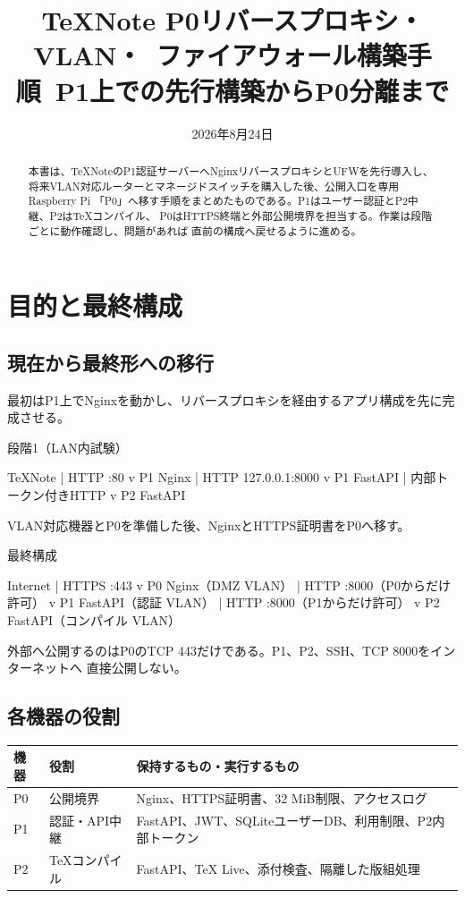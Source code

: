 \documentclass[uplatex,a4paper,11pt]{jsarticle}
\title{TeXNote P0リバースプロキシ・VLAN・\
ファイアウォール構築手順\
\large P1上での先行構築からP0分離まで}
\author{}
\date{2026年8月24日}
\begin{document}
\maketitle

\begin{abstract}
本書は、TeXNoteのP1認証サーバーへNginxリバースプロキシとUFWを先行導入し、
将来VLAN対応ルーターとマネージドスイッチを購入した後、公開入口を専用Raspberry Pi
「P0」へ移す手順をまとめたものである。P1はユーザー認証とP2中継、P2はTeXコンパイル、
P0はHTTPS終端と外部公開境界を担当する。作業は段階ごとに動作確認し、問題があれば
直前の構成へ戻せるように進める。
\end{abstract}

\tableofcontents
\newpage

\section{目的と最終構成}

\subsection{現在から最終形への移行}

最初はP1上でNginxを動かし、リバースプロキシを経由するアプリ構成を先に完成させる。

\begin{command}
段階1（LAN内試験）

TeXNote
   | HTTP :80
   v
P1 Nginx
   | HTTP 127.0.0.1:8000
   v
P1 FastAPI
   | 内部トークン付きHTTP
   v
P2 FastAPI
\end{command}

VLAN対応機器とP0を準備した後、NginxとHTTPS証明書をP0へ移す。

\begin{command}
最終構成

Internet
   | HTTPS :443
   v
P0 Nginx（DMZ VLAN）
   | HTTP :8000（P0からだけ許可）
   v
P1 FastAPI（認証 VLAN）
   | HTTP :8000（P1からだけ許可）
   v
P2 FastAPI（コンパイル VLAN）
\end{command}

外部へ公開するのはP0のTCP 443だけである。P1、P2、SSH、TCP 8000をインターネットへ
直接公開しない。

\subsection{各機器の役割}

\begin{longtable}{@{}p{18mm}p{46mm}p{82mm}@{}}
\toprule
機器 & 役割 & 保持するもの・実行するもの\\
\midrule
P0 & 公開境界 & Nginx、HTTPS証明書、32 MiB制限、アクセスログ\\
P1 & 認証・API中継 & FastAPI、JWT、SQLiteユーザーDB、利用制限、P2内部トークン\\
P2 & TeXコンパイル & FastAPI、TeX Live、添付検査、隔離した版組処理\\
\bottomrule
\end{longtable}
\end{document}
